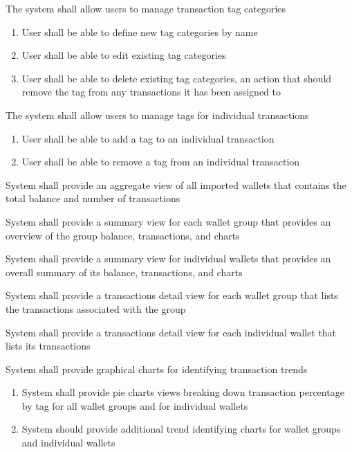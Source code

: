 \begin{adjustwidth}{1.5em}{0pt}
\begin{mainlist}
		\item The system shall allow users to manage transaction tag categories
		\begin{enumerate}
			\item User shall be able to define new tag categories by name
			\item User shall be able to edit existing tag categories
			\item User shall be able to delete existing tag categories, an action that should remove the tag from any transactions it has been assigned to
		\end{enumerate}
		
		\item The system shall allow users to manage tags for individual transactions
		\begin{enumerate}
			\item User shall be able to add a tag to an individual transaction
			\item User shall be able to remove a tag from an individual transaction
		\end{enumerate}

		\item System shall provide an aggregate view of all imported wallets that contains the total balance and number of transactions
		
		\item System shall provide a summary view for each wallet group that provides an overview of the group balance, transactions, and charts
		
		\item System shall provide a summary view for individual wallets that provides an overall summary of its balance, transactions, and charts
		
		\item System shall provide a transactions detail view for each wallet group that lists the transactions associated with the group
				
		\item System shall provide a transactions detail view for each individual wallet that lists its transactions
		
		\item System shall provide graphical charts for identifying transaction trends
		\begin{enumerate}
			\item System shall provide pie charts views breaking down transaction percentage by tag for all wallet groups and for individual wallets
			\item System should provide additional trend identifying charts for wallet groups and individual wallets
		\end{enumerate}
		

\end{mainlist}
\end{adjustwidth}
